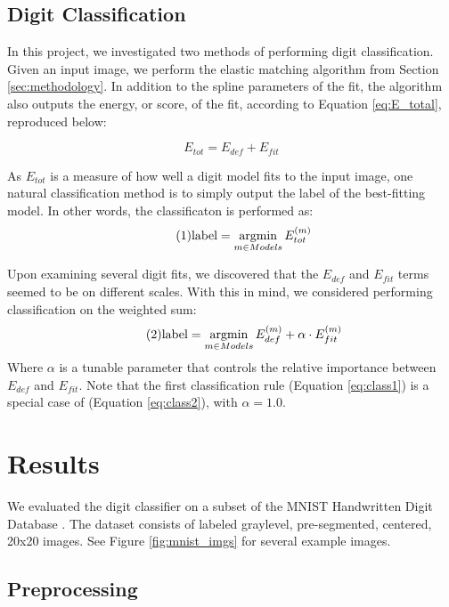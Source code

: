 \documentclass[oribibl]{llncs}
\newcommand\numberthis{\addtocounter{equation}{1}\tag{\theequation}} %
\newcommand{\argmin}{\operatornamewithlimits{argmin}}
\begin{document}
\subsection{Digit Classification}
\label{sec:classify}

In this project, we investigated two methods of performing digit classification.
Given an input image, we perform the elastic matching algorithm from Section \ref{sec:methodology}. 
In addition to the spline parameters of the fit, the algorithm also outputs the energy, or score, of the fit, according to Equation \ref{eq:E_total}, reproduced below:

\begin{equation*}
    E_{tot} = E_{def} + E_{fit}
\end{equation*}    

As $E_{tot}$ is a measure of how well a digit model fits to the input image, one natural classification method is to simply output the label of the best-fitting model.
In other words, the classificaton is performed as:
\begin{equation*}
\numberthis \label{eq:class1}
\text{label} = \argmin_{m \in Models}{E_{tot}^{(m)}}
\end{equation*}

Upon examining several digit fits, we discovered that the $E_{def}$ and $E_{fit}$ terms seemed to be on different scales.
With this in mind, we considered performing classification on the weighted sum:
\begin{equation*}
\numberthis \label{eq:class2}
\text{label} = \argmin_{m \in Models}{E_{def}^{(m)} + \alpha \cdot E_{fit}^{(m)}}
\end{equation*}
Where $\alpha$ is a tunable parameter that controls the relative importance between $E_{def}$ and $E_{fit}$.
Note that the first classification rule (Equation \ref{eq:class1}) is a special case of (Equation \ref{eq:class2}), with $\alpha = 1.0$.

\section{Results}

We evaluated the digit classifier on a subset of the MNIST Handwritten Digit Database \cite{mnist}.
The dataset consists of labeled graylevel, pre-segmented, centered, 20x20 images.
See Figure \ref{fig:mnist_imgs} for several example images.

\subsection{Preprocessing}
\label{sec:preproc}
\end{document}
